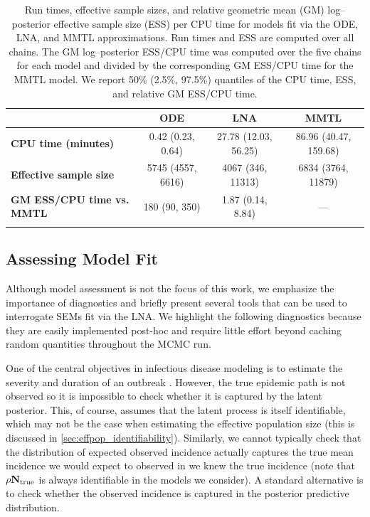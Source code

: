  \begin{table}[htbp]
 	\caption[Computational performance of the ODE, LNA, and MMTL approximations.]{Run times, effective sample sizes, and relative geometric mean (GM) log--posterior effective sample size (ESS) per CPU time for models fit via the ODE, LNA, and MMTL approximations. Run times and ESS are computed over all chains. The GM log--posterior ESS/CPU time was computed over the five chains for each model and divided by the corresponding GM ESS/CPU time for the MMTL model. We report 50\% (2.5\%, 97.5\%) quantiles of the CPU time, ESS, and relative GM ESS/CPU time.}
 	\label{tab:lna_coverage_compstats}
 	\footnotesize
 	\centering
 	\begin{tabular}{lccc}	
 		\hline	
 		& \textbf{ODE} & \textbf{LNA} & \textbf{MMTL} \\\hline
 		\textbf{CPU time (minutes)} &  0.42 (0.23, 0.64) & 27.78  (12.03, 56.25) & 86.96 (40.47, 159.68) \\ 
 		\textbf{Effective sample size} & 5745 (4557, 6616) & 4067   (346, 11313) & 6834 (3764, 11879) \\
 		\textbf{GM ESS/CPU time vs. MMTL} & 180 (90, 350) & 1.87 (0.14, 8.84) & --- \\
 		\hline
 		&&&
 	\end{tabular} 
 \end{table}

\subsection{Assessing Model Fit}
\label{subsec:lna_model_diags}

Although model assessment is not the focus of this work, we emphasize the importance of diagnostics and briefly present several tools that can be used to interrogate SEMs fit via the LNA. We highlight the following diagnostics because they are easily implemented post-hoc and require little effort beyond caching random quantities throughout the MCMC run. 

One of the central objectives in infectious disease modeling is to estimate the severity and duration of an outbreak \cite{lofgren2014opinion}. However, the true epidemic path is not observed so it is impossible to check whether it is captured by the latent posterior. This, of course, assumes that the latent process is itself identifiable, which may not be the case when estimating the effective population size (this is discussed in \ref{sec:effpop_identifiability}). Similarly, we cannot typically check that the distribution of expected observed incidence actually captures the true mean incidence we would expect to observed in we knew the true incidence (note that $ \rho\mathbf{N}_{\mathrm{true}} $ is always identifiable in the models we consider). A standard alternative is to check whether the observed incidence is captured in the posterior predictive distribution. 

